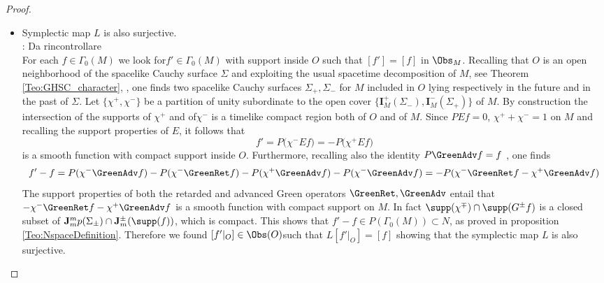 \documentclass[Main]{subfiles}
\begin{document}
\begin{proof}
\begin{itemize}
								\item Symplectic map $L$ is also surjective.
																		\\ \danger: Da rincontrollare	\\
									For each $f\in \Gamma_0(M)$ we look for$ f' \in \Gamma_0(M)$ with support inside $O$ such that $[f']=[f]$ in $\Obs_M$.
									Recalling that $O$ is an open neighborhood of the spacelike Cauchy surface $\Sigma$ and exploiting the usual spacetime decomposition of $M$, see Theorem \ref{Teo:GHSC_character}, , one finds two spacelike Cauchy surfaces $\Sigma_+,\Sigma_-$ for $M$ included in $O$ lying respectively in the future and in the past of $\Sigma$. Let $\{\chi^+,\chi^-\}$ be a partition of unity subordinate to the open cover $\{\mathbf{I}^+_M(\Sigma_-), \mathbf{I}^-_M(\Sigma_+)\}$ of $M$. 
									By construction the intersection of the supports of $\chi^+$ and of$\chi^-$ is a timelike compact region both of $O$ and of $M$. 
									Since $PE f = 0$, $\chi^+ +\chi^-=1$ on $M$ and recalling the support properties of $E$, it follows that 
									\begin{displaymath}
									f' = P\big( \chi^- E f \big) =  - P \big( \chi^+ E f \big)
									\end{displaymath}
									is a smooth function with compact support inside $O$. 
									Furthermore, recalling also the identity $P \GreenAdv f = f$ , one finds
									\begin{displaymath}
									f' -f = P(\chi^- \GreenAdv f) - P ( \chi^- \GreenRet f ) - P ( \chi^+ \GreenAdv f) - P(\chi^- \GreenAdv f) = - P(\chi^- \GreenRet f - \chi^+ \GreenAdv f )
									\end{displaymath}
									The support properties of both the retarded and advanced Green operators $\GreenRet, \GreenAdv$ entail that $-\chi^-\GreenRet f - \chi^+ \GreenAdv f$ is a smooth function with compact support on $M$. In fact $\supp(\chi^\mp) \cap \supp(G^\pm f )$ is a closed subset of $\mathbf{J}_m^mp(\Sigma_\pm) \cap \mathbf{J}_m^\pm(\supp(f))$, which is compact.
									This shows that $f' -f \in P(\Gamma_0(M)) \subset N$, as proved in proposition \ref{Teo:NspaceDefinition}. 
									Therefore we found $[ f'\vert_O] \in \Obs(O)$such that $L[ f'\vert_O]=[ f ]$ showing that the symplectic map $L$ is also surjective.
					\end{itemize}		
				\end{proof}
			

							
\end{document}
